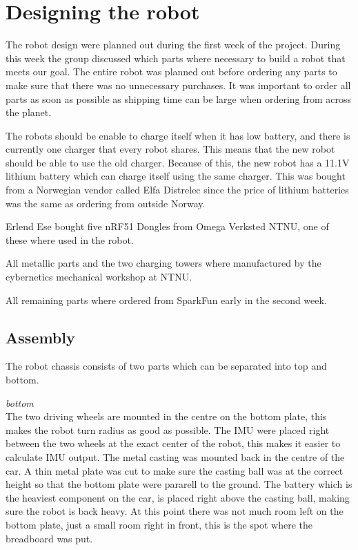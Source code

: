 \section{Designing the robot}
The robot design were planned out during the first week of the project. During this week the group discussed which parts where necessary to build a robot that meets our goal. The entire robot was planned out before ordering any parts to make sure that there was no unnecessary purchases. It was important to order all parts as soon as possible as shipping time can be large when ordering from across the planet.

The robots should be enable to charge itself when it has low battery, and there is currently one charger that every robot shares. This means that the new robot should be able to use the old charger. Because of this, the new robot has a 11.1V lithium battery which can charge itself using the same charger. This was bought from a Norwegian vendor called Elfa Distrelec\cite{elfa} since the price of lithium batteries was the same as ordering from outside Norway.

Erlend Ese bought five nRF51 Dongles from Omega Verksted NTNU, one of these where used in the robot.

All metallic parts and the two charging towers where manufactured by the cybernetics mechanical workshop at NTNU.


All remaining parts where ordered from SparkFun early in the second week.


\subsection{Assembly}
The robot chassis consists of two parts which can be separated into top and bottom.

\textit{bottom}\\
The two driving wheels are mounted in the centre on the bottom plate, this makes the robot turn radius as good as possible. The IMU were placed right between the two wheels at the exact center of the robot, this makes it easier to calculate IMU output. The metal casting was mounted back in the centre of the car. A thin metal plate was cut to make sure the casting ball was at the correct height so that the bottom plate were pararell to the ground. The battery which is the heaviest component on the car, is placed right above the casting ball, making sure the robot is back heavy. At this point there was not much room left on the bottom plate, just a small room right in front, this is the spot where the breadboard was put.

